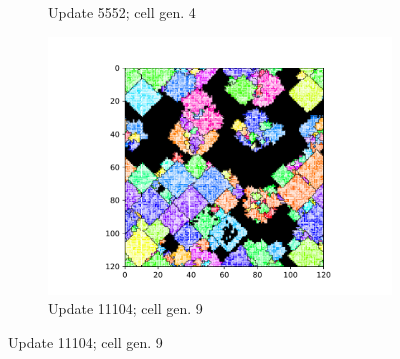 \begin{figure}
\begin{center}
\begin{subfigure}[b]{0.33\columnwidth}
  \caption{Update 5552; cell gen. 4}
  \label{fig:ChannelMap_1030_update55520}
\end{subfigure}%
\begin{subfigure}[b]{0.33\columnwidth}
  \includegraphics[width=\columnwidth,trim={2.5cm 0.5cm 2.5cm 1cm},clip]{img/ChannelMap_1030_update11104}
  \vspace{-5ex}
  \caption{Update 11104; cell gen. 9}
  \label{fig:ChannelMap_1030_update11104}
\end{subfigure}


\end{center}
\end{figure}
